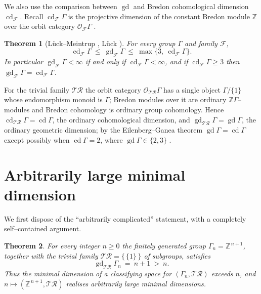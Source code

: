 \documentclass{amsart}
\newtheorem{theorem}{Theorem}
\theoremstyle{definition}
\newcommand{\Z}{\mathbb{Z}}
\newcommand{\gd}{\operatorname{gd}}
\newcommand{\cd}{\operatorname{cd}}
\newcommand{\OO}{\mathcal{O}}
\begin{document}
We also use the comparison between $\gd$ and Bredon cohomological dimension $\cd_{\mathcal F}$.
Recall $\cd_{\mathcal F}\Gamma$ is the projective dimension of the constant Bredon module
$\underline{\Z}$ over the orbit category $\OO_{\mathcal F}\Gamma$ \cite[Ch.~3]{Fluch}.

\begin{theorem}[Lück--Meintrup \cite{LueckMeintrup}, {Lück \cite[Thm.~13.19]{LueckSurvey}}]\label{thm:gdcd}
For every group $\Gamma$ and family $\mathcal F$,
\[
\cd_{\mathcal F}\Gamma\ \le\ \gd_{\mathcal F}\Gamma\ \le\ \max\{3,\ \cd_{\mathcal F}\Gamma\}.
\]
In particular $\gd_{\mathcal F}\Gamma<\infty$ if and only if $\cd_{\mathcal F}\Gamma<\infty$,
and if $\cd_{\mathcal F}\Gamma\ge 3$ then $\gd_{\mathcal F}\Gamma=\cd_{\mathcal F}\Gamma$.
\end{theorem}

For the trivial family $\mathcal{TR}$ the orbit category $\OO_{\mathcal{TR}}\Gamma$ has a single
object $\Gamma/\{1\}$ whose endomorphism monoid is $\Gamma$; Bredon modules over it are
ordinary $\Z\Gamma$--modules and Bredon cohomology is ordinary group cohomology. Hence
$\cd_{\mathcal{TR}}\Gamma=\cd\Gamma$, the ordinary cohomological dimension, and
$\gd_{\mathcal{TR}}\Gamma=\gd\Gamma$, the ordinary geometric dimension; by the
Eilenberg--Ganea theorem $\gd\Gamma=\cd\Gamma$ except possibly when $\cd\Gamma=2$, where
$\gd\Gamma\in\{2,3\}$ \cite[\S VIII.7]{Brown}.

\section{Arbitrarily large minimal dimension}

We first dispose of the ``arbitrarily complicated'' statement, with a completely
self--contained argument.

\begin{theorem}\label{thm:arb}
For every integer $n\ge 0$ the finitely generated group $\Gamma_n=\Z^{\,n+1}$, together with
the trivial family $\mathcal{TR}=\{\,\{1\}\,\}$ of subgroups, satisfies
\[
\gd_{\mathcal{TR}}\Gamma_n\ =\ n+1\ >\ n .
\]
Thus the minimal dimension of a classifying space for $(\Gamma_n,\mathcal{TR})$ exceeds $n$,
and $n\mapsto(\Z^{\,n+1},\mathcal{TR})$ realises arbitrarily large minimal dimensions.
\end{theorem}
\end{document}
